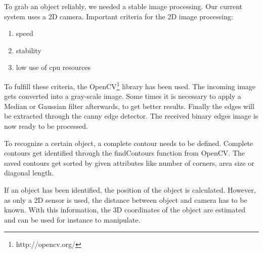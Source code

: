 To grab an object reliably, we needed a stable image processing. Our current system uses a 2D camera. Important criteria for the 2D image processing:


\begin{enumerate}
	\item speed
	\item stability
	\item low use of cpu resources
\end{enumerate}

To fulfill these criteria, the OpenCV\footnote{http://opencv.org/} library has been used. The incoming image gets converted into a gray-scale image. Some times it is necessary to apply a Median or Gaussian filter afterwards, to get better results. Finally the edges will be extracted through the canny edge detector. The received binary edges image is now ready to be processed.

To recognize a certain object, a complete contour needs to be defined. Complete contours get identified through the findContours function from OpenCV. The saved contours get sorted by given attributes like number of corners, area size or diagonal length.

If an object has been identified, the position of the object is calculated. However, as only a 2D sensor is used, the distance between object and camera has to be known. With this information, the 3D coordinates of the object are estimated and can be used for instance to manipulate.




